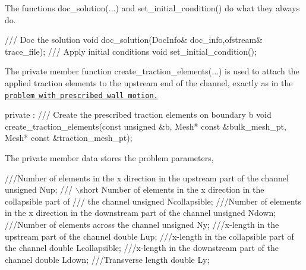 The functions {\ttfamily doc\+\_\+solution}(...) and {\ttfamily set\+\_\+initial\+\_\+condition()} do what they always do.


\begin{DoxyCodeInclude}
\textcolor{comment}{}
\textcolor{comment}{ /// Doc the solution}
\textcolor{comment}{} \textcolor{keywordtype}{void} doc\_solution(DocInfo& doc\_info,ofstream& trace\_file);
 \textcolor{comment}{}
\textcolor{comment}{ /// Apply initial conditions}
\textcolor{comment}{} \textcolor{keywordtype}{void} set\_initial\_condition();

\end{DoxyCodeInclude}


The private member function {\ttfamily create\+\_\+traction\+\_\+elements}(...) is used to attach the applied traction elements to the upstream end of the channel, exactly as in the \href{../../../navier_stokes/collapsible_channel/html/index.html}{\tt problem with prescribed wall motion.}


\begin{DoxyCodeInclude}

private : 
\textcolor{comment}{}
\textcolor{comment}{ /// Create the prescribed traction elements on boundary b}
\textcolor{comment}{} \textcolor{keywordtype}{void} create\_traction\_elements(\textcolor{keyword}{const} \textcolor{keywordtype}{unsigned} &b, 
                               Mesh* \textcolor{keyword}{const} &bulk\_mesh\_pt,
                               Mesh* \textcolor{keyword}{const} &traction\_mesh\_pt);

\end{DoxyCodeInclude}


The private member data stores the problem parameters,


\begin{DoxyCodeInclude}
 \textcolor{comment}{}
\textcolor{comment}{ ///Number of elements in the x direction in the upstream part of the channel}
\textcolor{comment}{} \textcolor{keywordtype}{unsigned} Nup;
\textcolor{comment}{}
\textcolor{comment}{ /// \(\backslash\)short Number of elements in the x direction in the collapsible part of }
\textcolor{comment}{ /// the channel}
\textcolor{comment}{} \textcolor{keywordtype}{unsigned} Ncollapsible;
\textcolor{comment}{}
\textcolor{comment}{ ///Number of elements in the x direction in the downstream part of the channel}
\textcolor{comment}{} \textcolor{keywordtype}{unsigned} Ndown;
\textcolor{comment}{}
\textcolor{comment}{ ///Number of elements across the channel}
\textcolor{comment}{} \textcolor{keywordtype}{unsigned} Ny;
\textcolor{comment}{}
\textcolor{comment}{ ///x-length in the upstream part of the channel}
\textcolor{comment}{} \textcolor{keywordtype}{double} Lup;
\textcolor{comment}{}
\textcolor{comment}{ ///x-length in the collapsible part of the channel}
\textcolor{comment}{} \textcolor{keywordtype}{double} Lcollapsible;
\textcolor{comment}{}
\textcolor{comment}{ ///x-length in the downstream part of the channel}
\textcolor{comment}{} \textcolor{keywordtype}{double} Ldown;
\textcolor{comment}{}
\textcolor{comment}{ ///Transverse length}
\textcolor{comment}{} \textcolor{keywordtype}{double} Ly;

\end{DoxyCodeInclude}


